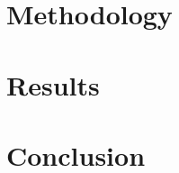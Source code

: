 \documentclass[12pt,paper=a4,twosided,cleardoubleage=plain,final]{report}
\newcommand{\comment}[1]{}
\begin{document}
\chapter{Methodology}


\chapter{Results}


\comment{summary, conclusion and recommendation}
\chapter{Conclusion}





\comment {
Definition. An appendix contains supplementary material that is not an essential part of the text itself but which may be helpful in providing a more comprehensive understanding of the research problem or it is information that is too cumbersome to be included in the body of the paper.
}

\renewcommand{\bibname}{References}



%
\end{document}
